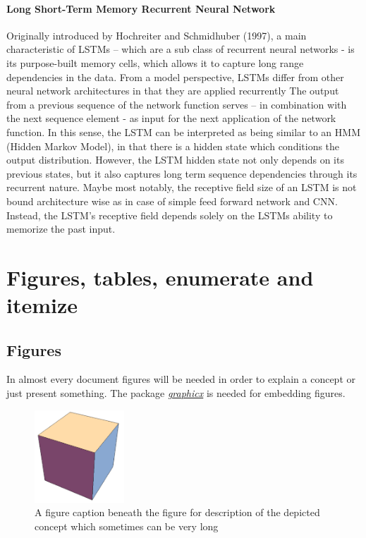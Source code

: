 \documentclass[a4paper,11pt,oneside]{book}
\newcommand{\imp}[1]{\underline{\textit{#1}}}
\begin{document}
\subsubsection{Long Short-Term Memory Recurrent Neural Network}
Originally introduced by Hochreiter and Schmidhuber (1997), a main characteristic of LSTMs – which are a sub class of recurrent neural networks - is its purpose-built memory cells, which allows it to capture long range dependencies in the data. From a model perspective, LSTMs differ from other neural network architectures in that they are applied recurrently\newline\newline
The output from a previous sequence of the network function serves – in combination with the next sequence element - as input for the next application of the network function. In this sense, the LSTM can be interpreted as being similar to an HMM (Hidden Markov Model), in that there is a hidden state which conditions the output distribution. However, the LSTM hidden state not only depends on its previous states, but it also captures long term sequence dependencies through its recurrent nature. Maybe most notably, the receptive field size of an LSTM is not bound architecture wise as in case of simple feed forward network and CNN. Instead, the LSTM’s receptive field depends solely on the LSTMs ability to memorize the past input.


\chapter{Figures, tables, enumerate and itemize}


\section{Figures}

In almost every document figures will be needed in order to explain a concept or just present something. The package \imp{graphicx} is needed for embedding figures.

\begin{figure}[!h]
	\centering
	\includegraphics[width=0.3\textwidth]{figures/cube}
	\caption{A figure caption beneath the figure for description of the depicted concept which sometimes can be very long}
	\label{ft_fig_firstfig}
\end{figure}
\end{document}

